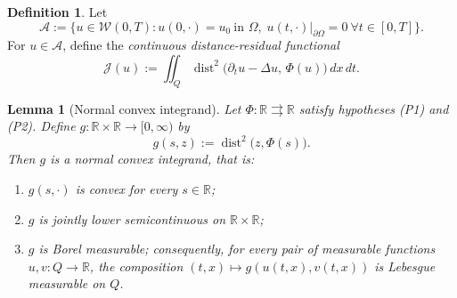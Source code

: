 \documentclass[11pt]{elsarticle}
\newtheorem{lemma}[theorem]{Lemma}
\theoremstyle{definition}
\newtheorem{definition}[theorem]{Definition}
\theoremstyle{remark}
\numberwithin{equation}{section}
\def\dist{\operatorname{dist}}
\begin{document}
	
	
	\begin{definition}\label{def:admissible-pde}
		Let
		\[
		\mathcal{A}
		:=
		\bigl\{u\in\mathcal{W}(0,T):
		u(0,\cdot)=u_0\ \text{in }\Omega,\;
		u(t,\cdot)|_{\partial\Omega}=0\ \forall t\in[0,T]
		\bigr\}.
		\]
		For $u\in\mathcal{A}$, define the \emph{continuous distance-residual
			functional}
		\[
		\mathcal{J}(u)
		:=
		\iint_{Q}\dist^2\bigl(\partial_t u-\Delta u,\,\Phi(u)\bigr)\,dx\,dt.
		\]
	\end{definition}
\begin{lemma}[Normal convex integrand]\label{lem:normal-integrand-parabolic}
	Let $\Phi:\mathbb{R}\rightrightarrows\mathbb{R}$ satisfy hypotheses (P1) and (P2).
	Define $g:\mathbb{R}\times\mathbb{R}\to[0,\infty)$ by
	\[
	g(s,z):=\operatorname{dist}^2\bigl(z,\Phi(s)\bigr).
	\]
	Then $g$ is a normal convex integrand, that is:
	\begin{enumerate}
		\item[(a)] $g(s,\cdot)$ is convex for every $s\in\mathbb{R}$;
		\item[(b)] $g$ is jointly lower semicontinuous on $\mathbb{R}\times\mathbb{R}$;
		\item[(c)] $g$ is Borel measurable; consequently, for every pair of measurable
		functions $u,v:Q\to\mathbb{R}$, the composition $(t,x)\mapsto g(u(t,x),v(t,x))$
		is Lebesgue measurable on $Q$.
	\end{enumerate}
\end{lemma}
\end{document}
